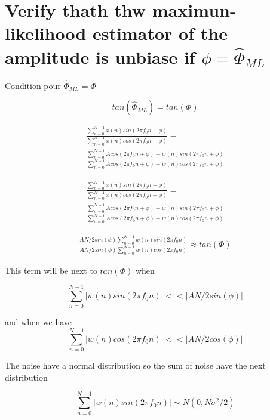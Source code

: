 \documentclass{report}
\begin{document}
\section{Verify thath thw maximun-likelihood estimator of the amplitude is unbiase if $\phi = \hat{\Phi}_{ML}$}

Condition pour $\hat{\Phi}_{ML} = \Phi$

\begin{equation}\label{key}
tan(\hat{\Phi}_{ML} )= tan(\Phi)
\end{equation}



\begin{gather*}
\frac{\sum_{n=0}^{N-1}x(n)sin(2\pi f_0n+\phi)}{\sum_{n=0}^{N-1}x(n)cos(2\pi f_0n+\phi)} = \\
\frac{\sum_{n=0}^{N-1}Acos(2\pi f_0n+\phi)+w(n)sin(2\pi f_0n+\phi)}{\sum_{n=0}^{N-1}Acos(2\pi f_0n+\phi)+w(n)cos(2\pi f_0n+\phi)}
\end{gather*}


\begin{gather*}
\frac{\sum_{n=0}^{N-1}x(n)sin(2\pi f_0n+\phi)}{\sum_{n=0}^{N-1}x(n)cos(2\pi f_0n+\phi)} = \\
\frac{\sum_{n=0}^{N-1}Acos(2\pi f_0n+\phi)+w(n)sin(2\pi f_0n+\phi)}{\sum_{n=0}^{N-1}Acos(2\pi f_0n+\phi)+w(n)cos(2\pi f_0n+\phi)}
\end{gather*}



\begin{gather*}
\frac{AN/2 sin(\phi)\sum_{n=0}^{N-1}w(n)sin(2\pi f_0n)}{AN/2 sin(\phi)\sum_{n=0}^{N-1}w(n)cos(2\pi f_0n)} \approx tan(\Phi)
\end{gather*}

This term will be next to $tan(\Phi)$ when 

\begin{equation}\label{key}
\sum_{n=0}^{N-1}|w(n)sin(2\pi f_0n)|<<|AN/2 sin(\phi)|
\end{equation}

and when we have 
\begin{equation}\label{key}
\sum_{n=0}^{N-1}|w(n)cos(2\pi f_0n)|<<|AN/2 cos(\phi)|
\end{equation}

The noise have a normal distribution so the sum of noise have the next distribution

\begin{equation}\label{key}
\sum_{n=0}^{N-1}|w(n)sin(2\pi f_0n)|\sim \textit{N}(0,N\sigma^2/2)
\end{equation}
\end{document}
